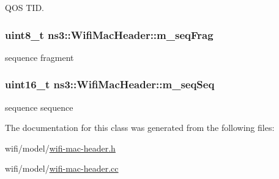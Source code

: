 Q\+OS T\+ID. 

\subsubsection[{\texorpdfstring{m\+\_\+seq\+Frag}{m_seqFrag}}]{\setlength{\rightskip}{0pt plus 5cm}uint8\+\_\+t ns3\+::\+Wifi\+Mac\+Header\+::m\+\_\+seq\+Frag\hspace{0.3cm}{\ttfamily [private]}}\hypertarget{classns3_1_1WifiMacHeader_a9281a55cbfc7a2ba57ecbeeec56fae07}{}\label{classns3_1_1WifiMacHeader_a9281a55cbfc7a2ba57ecbeeec56fae07}


sequence fragment 

\subsubsection[{\texorpdfstring{m\+\_\+seq\+Seq}{m_seqSeq}}]{\setlength{\rightskip}{0pt plus 5cm}uint16\+\_\+t ns3\+::\+Wifi\+Mac\+Header\+::m\+\_\+seq\+Seq\hspace{0.3cm}{\ttfamily [private]}}\hypertarget{classns3_1_1WifiMacHeader_a322d3a600f03f35b13e5e1f86b1b55e6}{}\label{classns3_1_1WifiMacHeader_a322d3a600f03f35b13e5e1f86b1b55e6}


sequence sequence 



The documentation for this class was generated from the following files\+:\begin{DoxyCompactItemize}
\item 
wifi/model/\hyperlink{wifi-mac-header_8h}{wifi-\/mac-\/header.\+h}\item 
wifi/model/\hyperlink{wifi-mac-header_8cc}{wifi-\/mac-\/header.\+cc}\end{DoxyCompactItemize}
